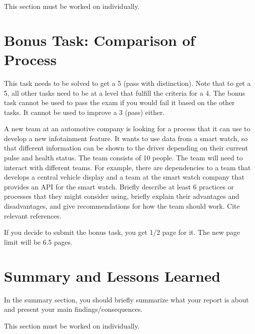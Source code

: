 \documentclass[conference]{IEEEtran}
\begin{document}
This section must be worked on individually.

\section{Bonus Task: Comparison of Process}
\label{sec:bonus_task}
This task needs to be solved to get a 5 (pass with distinction).
Note that to get a 5, all other tasks need to be at a level that fulfill the criteria for a 4.
The bonus task cannot be used to pass the exam if you would fail it based on the other tasks.
It cannot be used to improve a 3 (pass) either.

A new team at an automotive company is looking for a process that it can use to develop a new infotainment feature.
It wants to use data from a smart watch, so that different information can be shown to the driver depending on their current pulse and health status.
The team consists of 10 people.
The team will need to interact with different teams.
For example, there are dependencies to a team that develops a central vehicle display and a team at the smart watch company that provides an API for the smart watch.
Briefly describe at least 6 practices or processes that they might consider using, briefly explain their advantages and disadvantages, and give recommendations for how the team should work. Cite relevant references.

If you decide to submit the bonus task, you get 1/2 page for it. The new page limit will be 6.5 pages.
\section{Summary and Lessons Learned}
\label{sec:summary}
In the summary section, you should briefly summarize what your report is about and present your main findings/consequences.

This section must be worked on individually.





%	
%	
%	
%	
\end{document}
